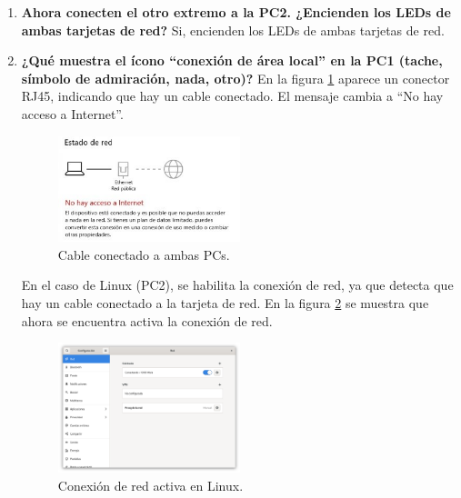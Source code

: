 \begin{enumerate}
            \item \textbf{Ahora conecten el otro extremo a la PC2. ¿Encienden los LEDs de ambas tarjetas de red?}
            Si, encienden los LEDs de ambas tarjetas de red.
            \item \textbf{¿Qué muestra el ícono ``conexión de área local'' en la PC1 (tache, símbolo de admiración, nada, otro)?}
            En la figura \ref{fig:cable_conectado_ambas} aparece un conector RJ45, indicando que hay un cable conectado. El mensaje cambia a ``No hay acceso a Internet''.
            \begin{figure}[H]
                \centering
                \includegraphics[width=0.5\textwidth]{img/cable_conectado_ambas.jpg}
                \caption{Cable conectado a ambas PCs.}
                \label{fig:cable_conectado_ambas}
            \end{figure}

            En el caso de Linux (PC2), se habilita la conexión de red, ya que detecta que hay un cable conectado a la tarjeta de red. En la figura \ref{fig:conexion_activa} se muestra que ahora se encuentra activa la conexión de red.

            \begin{figure}[H]
                \centering
                \includegraphics[width=0.5\textwidth]{img/cable_conectado_linux.png}
                \caption{Conexión de red activa en Linux.}
                \label{fig:conexion_activa}
            \end{figure}


\end{enumerate}
